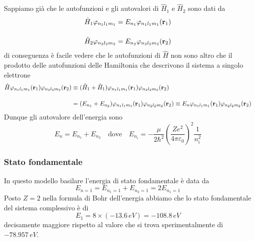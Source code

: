 Sappiamo gi\`a che le autofunzioni e gli autovalori di $\hat{H}_1$ e $\hat{H}_2$ sono dati da
\begin{align*}
	\hat{H}_1 \varphi_{n_1l_1m_1} = E_{n_1}\varphi_{n_1l_1m_1}(\bold{r}_1) \\[0.4cm]
	\hat{H}_2 \varphi_{n_2l_2m_2} = E_{n_2}\varphi_{n_2l_2m_2}(\bold{r}_2)
\end{align*}
di conseguenza \`e facile vedere che le autofunzioni di $\hat{H}$ non sono altro che il prodotto delle autofunzioni delle Hamiltonia che descrivono il sistema a singolo elettrone
\begin{align*}
	\hat{H}\varphi_{n_1l_1m_1}(\bold{r}_1)\varphi_{n_2l_2m_2}(\bold{r}_2) & \equiv (\hat{H}_1 + \hat{H}_1)\varphi_{n_1l_1m_1}(\bold{r}_1)\varphi_{n_2l_2m_2}(\bold{r}_2) \\[0.4cm]
	&=(E_{n_1} + E_{n_2}) \varphi_{n_1l_1m_1}(\bold{r}_1)\varphi_{n_2l_2m_2}(\bold{r}_2) \equiv E_n \varphi_{n_1l_1m_1}(\bold{r}_1)\varphi_{n_2l_2m_2}(\bold{r}_2)
\end{align*}
Dunque gli autovalore dell'energia sono 
\begin{equation*}
	E_n = E_{n_1} + E_{n_2} \quad \text{dove} \quad E_{n_i} = - \frac{\mu}{2\hbar^2}\left(\frac{Ze^2}{4 \pi \varepsilon_0}\right)^2 \frac{1}{n_i^2}
\end{equation*}

\subsubsection{Stato fondamentale}
In questo modello basilare l'energia di stato fondamentale \` e data da 
\begin{equation*}
	E_{n=1} = E_{n_1 =1} + E_{n_2 =1} = 2 E_{n_1=1}
\end{equation*}
Posto $Z =2$ nella formula di Bohr dell'energia abbiamo che lo stato fondamentale del sistema complessivo \`e di 
\begin{equation*}
	E_1 = 8 \times (-13.6 \,eV) = - 108.8 \, eV
\end{equation*}
decisamente maggiore rispetto al valore che si trova sperimentalmente di $-78.957 \, eV$.

